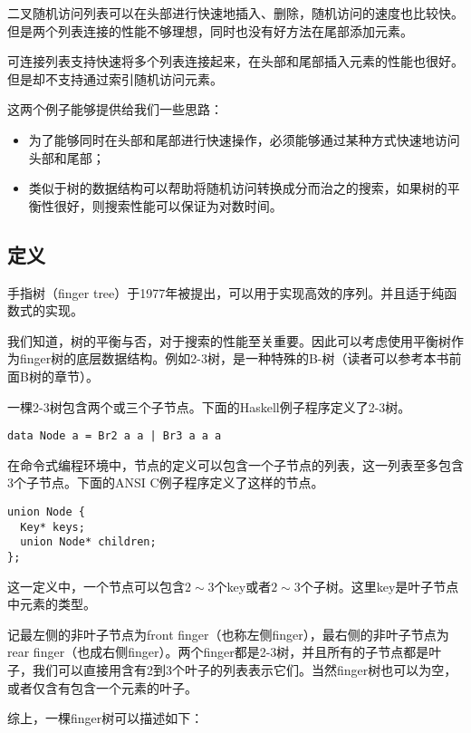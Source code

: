 \documentclass[UTF8]{article}
\begin{document}
二叉随机访问列表可以在头部进行快速地插入、删除，随机访问的速度也比较快。但是两个列表连接的性能不够理想，同时也没有好方法在尾部添加元素。

可连接列表支持快速将多个列表连接起来，在头部和尾部插入元素的性能也很好。但是却不支持通过索引随机访问元素。

这两个例子能够提供给我们一些思路：

\begin{itemize}
\item 为了能够同时在头部和尾部进行快速操作，必须能够通过某种方式快速地访问头部和尾部；
\item 类似于树的数据结构可以帮助将随机访问转换成分而治之的搜索，如果树的平衡性很好，则搜索性能可以保证为对数时间。
\end{itemize}

\subsection{定义}
手指树（finger tree）\cite{finger-tree-1977}于1977年被提出，可以用于实现高效的序列。并且适于纯函数式的实现\cite{finger-tree-2006}。

我们知道，树的平衡与否，对于搜索的性能至关重要。因此可以考虑使用平衡树作为finger树的底层数据结构。例如2-3树，是一种特殊的B-树（读者可以参考本书前面B树的章节）。

一棵2-3树包含两个或三个子节点。下面的Haskell例子程序定义了2-3树。

\lstset{language=Haskell}
\begin{lstlisting}
data Node a = Br2 a a | Br3 a a a
\end{lstlisting}

在命令式编程环境中，节点的定义可以包含一个子节点的列表，这一列表至多包含3个子节点。下面的ANSI C例子程序定义了这样的节点。

\lstset{language=C}
\begin{lstlisting}
union Node {
  Key* keys;
  union Node* children;
};
\end{lstlisting}

这一定义中，一个节点可以包含$2 \sim 3$个key或者$2 \sim 3$个子树。这里key是叶子节点中元素的类型。

记最左侧的非叶子节点为front finger（也称左侧finger），最右侧的非叶子节点为rear finger（也成右侧finger）。两个finger都是2-3树，并且所有的子节点都是叶子，我们可以直接用含有2到3个叶子的列表表示它们。当然finger树也可以为空，或者仅含有包含一个元素的叶子。

综上，一棵finger树可以描述如下：
\end{document}
